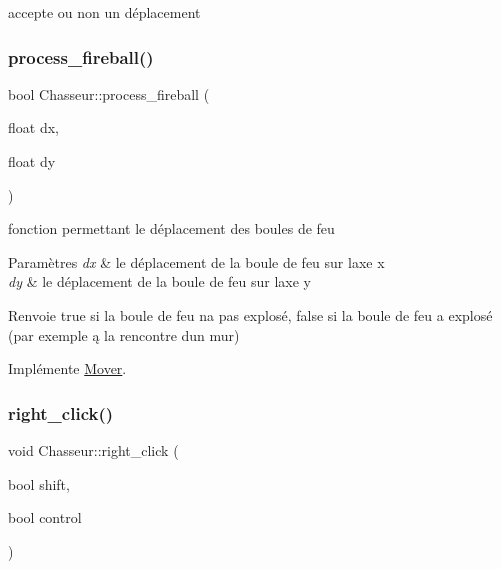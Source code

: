 accepte ou non un déplacement 

\mbox{\label{classChasseur_a00710f53a84dfcf6ae60deed589cea1e}} 
\subsubsection{\texorpdfstring{process\+\_\+fireball()}{process\_fireball()}}
{\footnotesize\ttfamily bool Chasseur\+::process\+\_\+fireball (\begin{DoxyParamCaption}\item[{float}]{dx,  }\item[{float}]{dy }\end{DoxyParamCaption})\hspace{0.3cm}{\ttfamily [virtual]}}



fonction permettant le déplacement des boules de feu 


\begin{DoxyParams}{Paramètres}
{\em dx} & le déplacement de la boule de feu sur l\textquotesingle{}axe x \\
\hline
{\em dy} & le déplacement de la boule de feu sur l\textquotesingle{}axe y \\
\hline
\end{DoxyParams}
\begin{DoxyReturn}{Renvoie}
true si la boule de feu n\textquotesingle{}a pas explosé, false si la boule de feu a explosé (par exemple ą la rencontre d\textquotesingle{}un mur) 
\end{DoxyReturn}


Implémente \hyperlink{classMover_a6d794056f34e2348d32ae4ff49326070}{Mover}.

\mbox{\label{classChasseur_ac33c7c026b2bb1c05d074fa196bd1fae}} 
\subsubsection{\texorpdfstring{right\+\_\+click()}{right\_click()}}
{\footnotesize\ttfamily void Chasseur\+::right\+\_\+click (\begin{DoxyParamCaption}\item[{bool}]{shift,  }\item[{bool}]{control }\end{DoxyParamCaption})\hspace{0.3cm}{\ttfamily [virtual]}}



